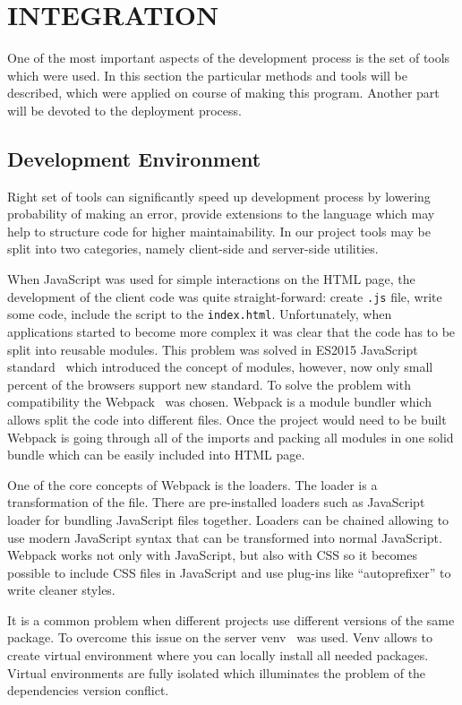 \section{INTEGRATION}

One of the most important aspects of the development process is the set of tools which were
used. In this section the particular methods and tools will be described, which
were applied on course of making this program. Another part will be devoted to
the deployment process.

\subsection{Development Environment}

Right set of tools can significantly speed up development process by lowering probability of making
an error, provide extensions to the language which may help to structure code for higher
maintainability. In our project tools may be split into two categories, namely client-side and
server-side utilities.

When JavaScript was used for simple interactions on the HTML page, the development of the client
code was quite straight-forward: create \texttt{.js} file, write some code, include the script to
the \texttt{index.html}. Unfortunately, when applications started to become more complex it was
clear that the code has to be split into reusable modules. This problem was solved in ES2015
JavaScript standard~\cite{es2015} which introduced the concept of modules, however, now only small
percent of the browsers support new standard. To solve the problem with compatibility the
Webpack~\cite{webpack} was chosen. Webpack is a module bundler which allows split the code into
different files. Once the project would need to be built Webpack is going through all of the imports
and packing all modules in one solid bundle which can be easily included into HTML page.

One of the core concepts of Webpack is the loaders. The loader is a transformation
of the file. There are pre-installed loaders such as JavaScript loader for
bundling JavaScript files together. Loaders can be chained allowing to use modern
JavaScript syntax that can be transformed into normal JavaScript. Webpack
works not only with JavaScript, but also with CSS so it becomes possible to include
CSS files in JavaScript and use plug-ins like ``autoprefixer'' to write cleaner styles.

It is a common problem when different projects use different versions of the same package. To
overcome this issue on the server venv~\cite{venv} was used. Venv allows to create virtual
environment where you can locally install all needed packages. Virtual environments are fully
isolated which illuminates the problem of the dependencies version conflict.

